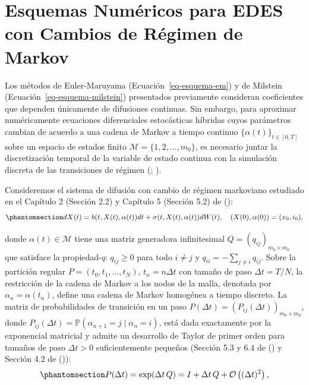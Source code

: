 \documentclass[
  spanish,
  us-letterpaper,
]{scrreprt}
\numberwithin{equation}{section}
\theoremstyle{plain}
\theoremstyle{plain}
\theoremstyle{definition}
\theoremstyle{plain}
\theoremstyle{remark}
\begin{document}
\section{Esquemas Numéricos para EDES con Cambios de Régimen de
Markov}\label{sec-numerico-switching}

Los métodos de Euler-Maruyama (Ecuación~\ref{eq-esquema-em}) y de
Milstein (Ecuación~\ref{eq-esquema-milstein}) presentados previamente
consideran coeficientes que dependen únicamente de difusiones continuas.
Sin embargo, para aproximar numéricamente ecuaciones diferenciales
estocásticas híbridas cuyos parámetros cambian de acuerdo a una cadena
de Markov a tiempo continuo \(\{\alpha(t)\}_{t \in [0, T]}\) sobre un
espacio de estados finito \(\mathcal{M} = \{1, 2, \dots, m_0\}\), es
necesario juntar la discretización temporal de la variable de estado
continua con la simulación discreta de las transiciones de régimen
(;
).

Consideremos el sistema de difusión con cambio de régimen markoviano
estudiado en el Capítulo 2 (Sección 2.2) y Capítulo 5 (Sección 5.2) de
():
\begin{equation}\phantomsection\label{eq-ede-switching-num}{
dX(t) = b(t, X(t), \alpha(t))dt + \sigma(t, X(t), \alpha(t))dW(t), \quad (X(0), \alpha(0)) = (x_0, i_0),
}\end{equation}

donde \(\alpha(t) \in \mathcal{M}\) tiene una matriz generadora
infinitesimal \(Q = (q_{ij})_{m_0 \times m_0}\) que satisface la
propiedad-\(q\): \(q_{ij} \ge 0\) para todo \(i \neq j\) y
\(\displaystyle q_{ii} = -\sum_{j \neq i} q_{ij}\). Sobre la partición
regular \(P = (t_0, t_1, \dots, t_N)\), \(t_n = n\Delta t\) con tamaño
de paso \(\Delta t = T/N\), la restricción de la cadena de Markov a los
nodos de la malla, denotada por \(\alpha_n = \alpha(t_n)\), define una
cadena de Markov homogénea a tiempo discreto. La matriz de
probabilidades de transición en un paso
\(P(\Delta t) = (P_{ij}(\Delta t))_{m_0 \times m_0}\), donde
\(P_{ij}(\Delta t) = \mathbb{P}(\alpha_{n+1} = j \mid \alpha_n = i)\),
está dada exactamente por la exponencial matricial y admite un
desarrollo de Taylor de primer orden para tamaños de paso
\(\Delta t > 0\) suficientemente pequeños (Sección 5.3 y 6.4 de
() y Sección 4.2 de
()):
\begin{equation}\phantomsection\label{eq-matriz-transicion-discreta}{
P(\Delta t) = \exp(\Delta t \, Q) = I + \Delta t \, Q + \mathcal{O}\left((\Delta t)^2\right),
}\end{equation}
\end{document}
